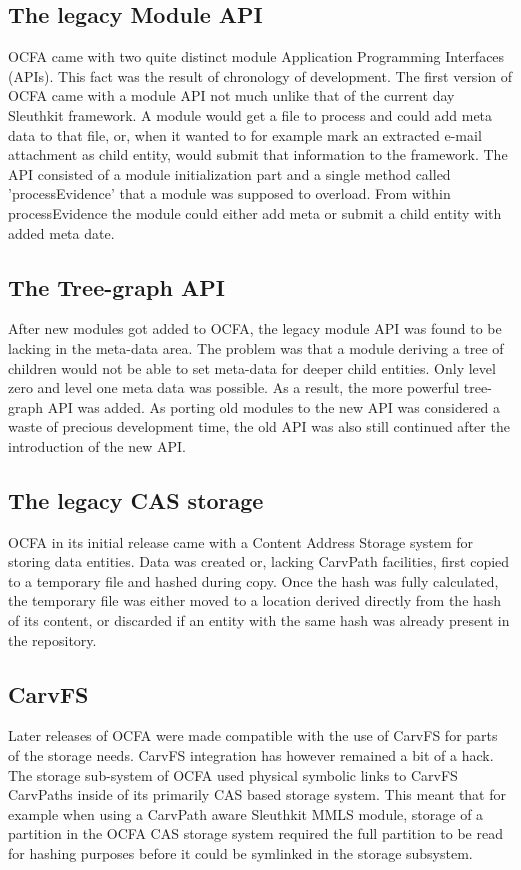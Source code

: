 \subsection{The legacy Module API}
OCFA came with two quite distinct module Application Programming Interfaces (APIs). This fact was the result of chronology of development. The first version of OCFA came with a module API not much unlike that of the current day Sleuthkit framework. A module would get a file to process and could add meta data to that file, or, when it wanted to for example mark an extracted e-mail attachment as child entity, would submit that information to the framework. The API consisted of a module initialization part and a single method called 'processEvidence' that a module was supposed to overload. From within processEvidence the module could either add meta or submit a child entity with added meta date.
\subsection{The Tree-graph API}
After new modules got added to OCFA, the legacy module API was found to be lacking in the meta-data area. The problem was that a module deriving a tree of children would not be able to set meta-data for deeper child entities. Only level zero and level one meta data was possible. As a result, the more powerful tree-graph API was added. As porting old modules to the new API was considered a waste of precious development time, the old API was also still continued after the introduction of the new API.
\subsection{The legacy CAS storage}
OCFA in its initial release came with a Content Address Storage system for storing data entities. Data was created or, lacking CarvPath facilities, first copied to a temporary file and hashed during copy. Once the hash was fully calculated, the temporary file was either moved to a location derived directly from the hash of its content, or discarded if an entity with the same hash was already present in the repository. 
\subsection{CarvFS}
Later releases of OCFA were made compatible with the use of CarvFS for parts of the storage needs. CarvFS integration has however remained a bit of a hack. The storage sub-system of OCFA used physical symbolic links to CarvFS CarvPaths inside of its primarily CAS based storage system. This meant that for example when using a CarvPath aware Sleuthkit MMLS module, storage of a partition in the OCFA CAS storage system required the full partition to be read for hashing purposes before it could be symlinked in the storage subsystem.
